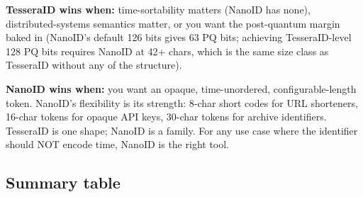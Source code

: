 \textbf{TesseraID wins when:} time-sortability matters (NanoID has none), distributed-systems semantics matter, or you want the post-quantum margin baked in (NanoID's default 126 bits gives 63 PQ bits; achieving TesseraID-level 128 PQ bits requires NanoID at 42+ chars, which is the same size class as TesseraID without any of the structure).

\textbf{NanoID wins when:} you want an opaque, time-unordered, configurable-length token. NanoID's flexibility is its strength: 8-char short codes for URL shorteners, 16-char tokens for opaque API keys, 30-char tokens for archive identifiers. TesseraID is one shape; NanoID is a family. For any use case where the identifier should NOT encode time, NanoID is the right tool.

\subsection{Summary table}


